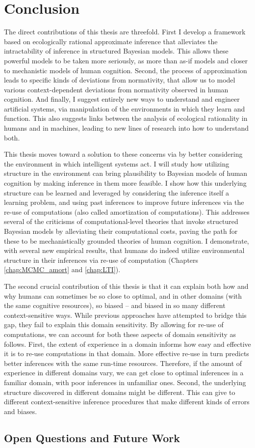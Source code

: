 \chapter{Conclusion}
\label{chap:conclusion}

The direct contributions of this thesis are threefold. First I develop a framework based on ecologically rational approximate inference that alleviates the intractability of inference in structured Bayesian models. This allows these powerful models to be taken more seriously, as more than as-if models and closer to mechanistic models of human cognition. Second, the process of approximation leads to specific kinds of deviations from normativity, that allow us to model various context-dependent deviations from normativity observed in human cognition. And finally, I suggest entirely new ways to understand and engineer artificial systems, via manipulation of the environments in which they learn and function. This also suggests links between the analysis of ecological rationality in humans and in machines, leading to new lines of research into how to understand both.

This thesis moves toward a solution to these concerns via by better considering the environment in which intelligent systems act. I will study how utilizing structure in the environment can bring plausibility to Bayesian models of human cognition by making inference in them more feasible. I show how this underlying structure can be learned and leveraged by considering the inference itself a learning problem, and using past inferences to improve future inferences via the re-use of computations (also called amortization of computations). This addresses several of the criticisms of computational-level theories that invoke structured Bayesian models by alleviating their computational costs, paving the path for these to be mechanistically grounded theories of human cognition. I demonstrate, with several new empirical results, that humans do indeed utilize environmental structure in their inferences via re-use of computation (Chapters \ref{chap:MCMC_amort} and \ref{chap:LTI}). 

The second crucial contribution of this thesis is that it can explain both how and why humans can sometimes be so close to optimal, and in other domains (with the same cognitive resources), so biased -- and biased in so many different context-sensitive ways. While previous approaches have attempted to bridge this gap, they fail to explain this domain sensitivity. By allowing for re-use of computations, we can account for both these aspects of domain sensitivity as follows. First, the extent of experience in a domain informs how easy and effective it is to re-use computations in that domain. More effective re-use in turn predicts better inferences with the same run-time resources. Therefore, if the amount of experience in different domains vary, we can get close to optimal inferences in a familiar domain, with poor inferences in unfamiliar ones. Second, the underlying structure discovered in different domains might be different. This can give to different context-sensitive inference procedures that make different kinds of errors and biases.

\section*{Open Questions and Future Work}